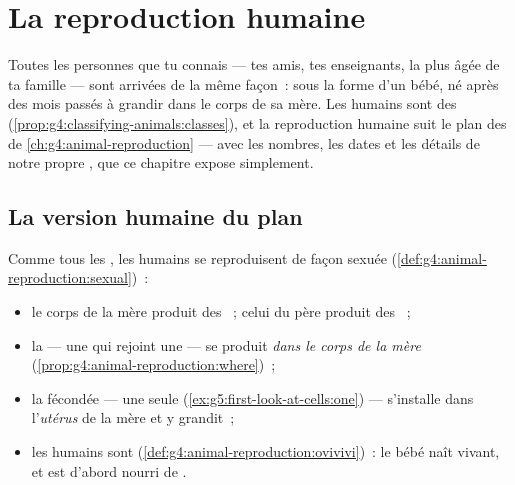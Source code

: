 \chapter{La reproduction humaine}\label{ch:g5:human-reproduction}

Toutes les personnes que tu connais --- tes amis, tes enseignants,
la plus âgée de ta famille --- sont arrivées de la même façon~: sous
la forme d'un bébé, né après des mois passés à grandir dans le corps
de sa mère. Les humains sont des 
(\cref{prop:g4:classifying-animals:classes}), et la reproduction
humaine suit le plan des  de
\cref{ch:g4:animal-reproduction} --- avec les nombres, les dates et
les détails de notre propre , que ce chapitre expose
simplement.

\section{La version humaine du plan}

\begin{proposition}\label{prop:g5:human-reproduction:plan}
Comme tous les , les humains se reproduisent de façon
sexuée (\cref{def:g4:animal-reproduction:sexual})~:
\begin{itemize}
  \item le corps de la mère produit des \emph{}~;
        celui du père produit des \emph{}~;
  \item la  --- une  qui rejoint une
         --- se produit \emph{dans le corps de la mère}
        (\cref{prop:g4:animal-reproduction:where})~;
  \item la  fécondée --- une seule 
        (\cref{ex:g5:first-look-at-cells:one}) --- s'installe dans
        l'\emph{utérus} de la mère et y grandit~;
  \item les humains sont 
        (\cref{def:g4:animal-reproduction:ovivivi})~: le bébé naît
        vivant, et est d'abord nourri de .
\end{itemize}
\end{proposition}
\admitted

